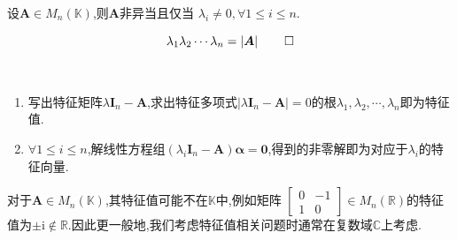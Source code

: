 \begin{green}
\begin{corollary}[非异阵判定]\label{cor:非异阵判定}
    设$\bm{A}\in M_n\left(\mathbb{K}\right)$,则$\bm{A}$非异当且仅当
    $\lambda_i\neq 0,\forall 1\leqslant i\leqslant n.$
\end{corollary}
\begin{Proof}
\[
 \lambda_1\lambda_2\cdots \lambda_n=\left|\bm{A}\right|\qedhere
\]
\end{Proof}
\end{green}
\begin{formal}
\begin{proposition}[求特征值和特征向量的方法]\label{prop:求特征值和特征向量的方法}\,

     \begin{enumerate} [label = {\textup{(\arabic*)}}]
        \item 写出特征矩阵$\lambda \bm{I}_n-\bm{A}$,求出特征多项式$\left|\lambda \bm{I}_n-\bm{A}\right|=0$的根$\lambda_1,\lambda_2,\cdots,\lambda_n$即为特征值.
        \item $\forall 1\leqslant i\leqslant n$,解线性方程组$\left(
            \lambda_i\bm{I}_n-\bm{A}
        \right)\bm{\alpha}=\bm{0}$,得到的非零解即为对应于$\lambda_i$的特征向量.
     \end{enumerate}
\end{proposition}
\end{formal}
\begin{red}
\begin{remark}
    对于$\bm{A}\in M_n\left(
        \mathbb{K}
    \right)$,其特征值可能不在$\mathbb{K}$中,例如矩阵
    $\begin{bmatrix}
        0&-1\\
        1&0
    \end{bmatrix}\in M_n\left(
        \mathbb{R}
    \right)$的特征值为$\pm \mathrm{i}
    \notin \mathbb{R}$.因此更一般地,我们考虑特征值相关问题时通常在复数域$\mathbb{C}$上考虑.
\end{remark}
\end{red}

